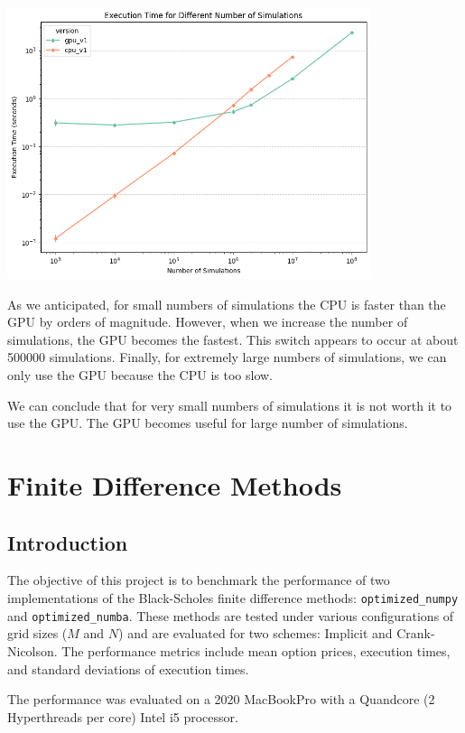 \documentclass[12pt,a4paper]{report}
\begin{document}
\begin{center}
\includegraphics[width=0.8\textwidth]{gpu_vs_cpu.png}\par
\end{center}

As we anticipated, for small numbers of simulations the CPU is faster than the GPU by orders of magnitude. However, when we increase the number of simulations, the GPU becomes the fastest. This switch appears to occur at about 500000 simulations. Finally, for extremely large numbers of simulations, we can only use the GPU because the CPU is too slow.

We can conclude that for very small numbers of simulations it is not worth it to use the GPU. The GPU becomes useful for large number of simulations. 

\section{Finite Difference Methods}

\subsection{Introduction}

The objective of this project is to benchmark the performance of two implementations of the Black-Scholes finite difference methods: \texttt{optimized\_numpy} and \texttt{optimized\_numba}. These methods are tested under various configurations of grid sizes (\(M\) and \(N\)) and are evaluated for two schemes: Implicit and Crank-Nicolson. The performance metrics include mean option prices, execution times, and standard deviations of execution times.

The performance was evaluated on a 2020 MacBookPro with a Quandcore (2 Hyperthreads per core) Intel i5 processor.
\end{document}
